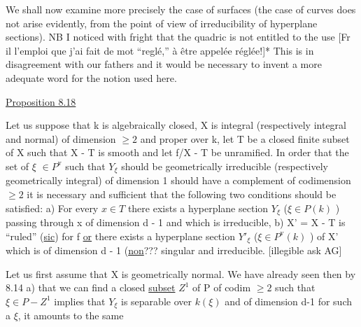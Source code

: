 
We shall now examine more precisely the case of surfaces (the
case of curves does not arise evidently, from the point of view of
irreducibility of hyperplane sections).
NB  I noticed with fright that the quadric is not entitled to the
use [Fr il l'emploi que j'ai fait de mot
``reglé,'' à être appelée réglée!]*
This is in disagreement with our fathers and it would be necessary
to invent a more adequate word for the notion used here.

\uline{Proposition 8.18}

Let us suppose that k is algebraically closed, X is integral
(respectively integral and normal) of dimension $\geq 2$ and proper
over k, let T be a closed finite subset of X such that X - T is
smooth and let f/X - T be unramified.  In order that the set of $\xi$
$\in P^{\mathrm{v}}$ such that $Y_{\xi}$ should be geometrically irreducible (respectively
geometrically integral) of dimension 1 should have a complement of
codimension $\geq 2$ it is necessary and sufficient that the following
two conditions should be satisfied:  a) For every $x \in T$ there
exists a hyperplane section $Y_{\xi}$ ($\xi \in P(k)$ ) passing through x of
dimension d - 1 and which is irreducible, b) X' = X - T is ``ruled''
(\uline{sic}) for f \uline{or} there exists a hyperplane section $Y'_{\xi}$ ($\xi \in P^{\mathrm{v}}(k)$ ) of
X' which is of dimension d - 1 (\uline{non}??? singular and irreducible.
[illegible ask AG]

Let us first assume that X is geometrically normal.  We have
already seen then by 8.14  a) that we can find a closed \uline{subset} $Z^{1}$
of P of codim $\geq 2$ such that $\xi \in P-Z^{1}$ implies that $Y_{\xi}$ is separable
over $k(\xi)$ and of dimension d-1 for such a $\xi$, it amounts to the same

